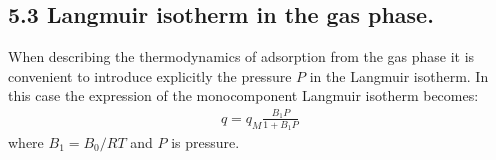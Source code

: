 \documentclass[letterpaper,10pt,english]{jupyterBook}
\begin{document}
\subsection{5.3 Langmuir isotherm in the gas phase.}
\label{\detokenize{Langmuir_isotherm:langmuir-isotherm-in-the-gas-phase}}
\sphinxAtStartPar
When describing the thermodynamics of adsorption from the gas phase it is convenient to introduce explicitly the pressure \(P\) in the Langmuir isotherm.
In this case the expression of the monocomponent Langmuir isotherm becomes:
\begin{equation}\label{equation:Langmuir_isotherm:LANGeq8}
\begin{split}
q=q_M\frac{B_1{P}}{1+B_1{P}}
\end{split}
\end{equation}
\sphinxAtStartPar
where \(B_1=B_0/RT\) and \(P\) is pressure.
\end{document}
